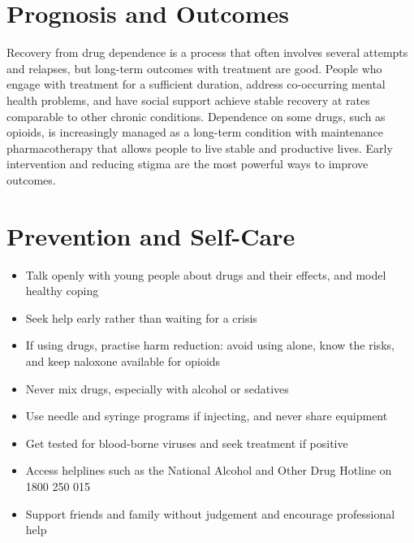 \section*{Prognosis and Outcomes}
Recovery from drug dependence is a process that often involves several attempts and relapses, but long-term outcomes with treatment are good. People who engage with treatment for a sufficient duration, address co-occurring mental health problems, and have social support achieve stable recovery at rates comparable to other chronic conditions. Dependence on some drugs, such as opioids, is increasingly managed as a long-term condition with maintenance pharmacotherapy that allows people to live stable and productive lives. Early intervention and reducing stigma are the most powerful ways to improve outcomes.

\section*{Prevention and Self-Care}
\begin{itemize}
    \item Talk openly with young people about drugs and their effects, and model healthy coping
    \item Seek help early rather than waiting for a crisis
    \item If using drugs, practise harm reduction: avoid using alone, know the risks, and keep naloxone available for opioids
    \item Never mix drugs, especially with alcohol or sedatives
    \item Use needle and syringe programs if injecting, and never share equipment
    \item Get tested for blood-borne viruses and seek treatment if positive
    \item Access helplines such as the National Alcohol and Other Drug Hotline on 1800 250 015
    \item Support friends and family without judgement and encourage professional help
\end{itemize}

